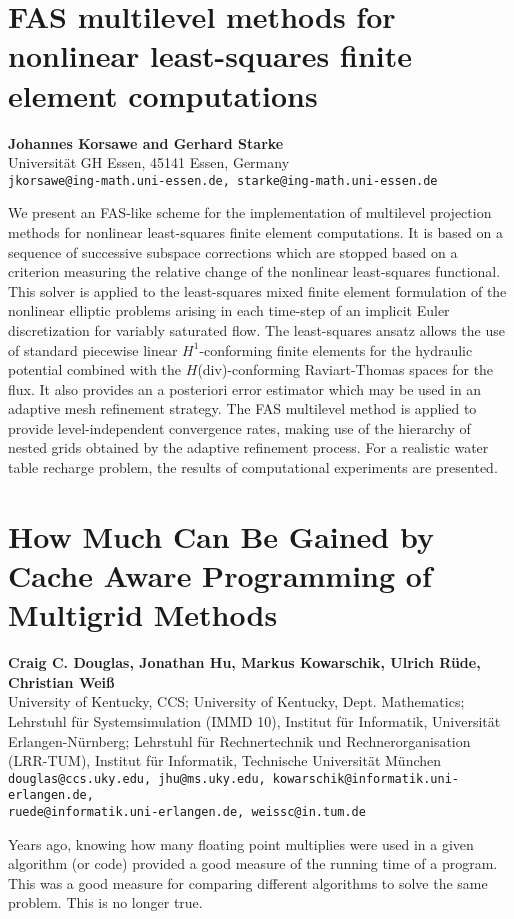 \documentclass[11pt]{article}
\newcommand{\nextab}[4]{
	\section{#2}
	{\bf #1} \\ \nopagebreak
	{#3} \\ \nopagebreak
	{\tt #4} \nopagebreak
	}
\begin{document}

\nextab{Johannes Korsawe and Gerhard Starke}
	{FAS multilevel methods for nonlinear least-squares finite
		element computations}
	{Universit\"at GH Essen, 45141 Essen, Germany}
	{jkorsawe@ing-math.uni-essen.de, starke@ing-math.uni-essen.de}


We present an FAS-like scheme for the implementation of
multilevel projection methods for nonlinear least-squares finite element computations.
It is based on a sequence of successive
subspace corrections which are stopped based on a criterion measuring the relative
change of the nonlinear least-squares functional.
This solver is applied to the least-squares mixed finite element formulation of
the nonlinear elliptic problems arising in each time-step of an implicit Euler
discretization for variably saturated flow. The least-squares ansatz allows
the use of standard piecewise linear
$H^1$-conforming finite elements for the hydraulic potential combined with
the $H$(div)-conforming Raviart-Thomas spaces for the flux.
It also provides an a posteriori error estimator which may be used in an
adaptive mesh refinement strategy.
The FAS multilevel method is applied to provide level-independent convergence
rates, making use of the hierarchy of nested grids obtained by the adaptive
refinement process.
For a realistic water table recharge problem, the results of computational
experiments are presented.


\nextab{Craig C. Douglas, Jonathan Hu, Markus Kowarschik,
		Ulrich R\"ude, Christian Wei\ss}
	{How Much Can Be Gained by Cache Aware
		Programming of Multigrid Methods}
	{University of Kentucky, CCS;
		University of Kentucky, Dept. Mathematics;
		Lehrstuhl f\"ur Systemsimulation
		(IMMD 10), Institut f\"ur Informatik,
		Universit\"at Erlangen-N\"urnberg;
		Lehrstuhl f\"ur Rechnertechnik und Rechnerorganisation
		(LRR-TUM), Institut f\"ur Informatik,
		Technische Universit\"at M\"unchen}
	{douglas@ccs.uky.edu, jhu@ms.uky.edu,
		kowarschik@informatik.uni-erlangen.de, \\
		ruede@informatik.uni-erlangen.de,
		weissc@in.tum.de}


Years ago, knowing how many floating point multiplies were used in a given
algorithm (or code) provided a good measure of the running time of a program.
This was a good measure for comparing different algorithms to solve the same
problem.
This is no longer true.
\end{document}

